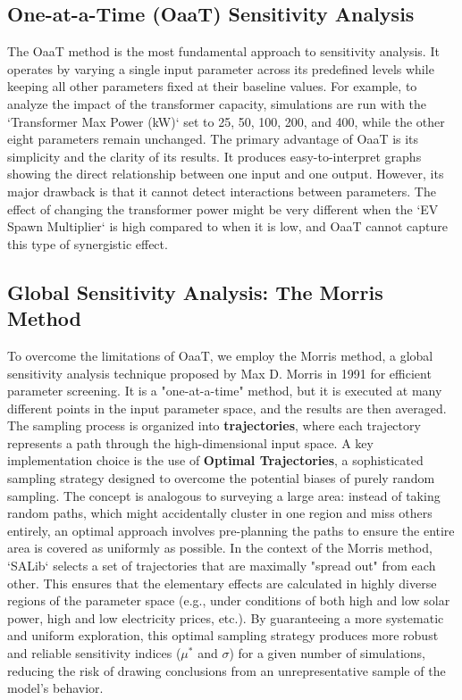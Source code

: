 \subsection{One-at-a-Time (OaaT) Sensitivity Analysis}
\noindent
The OaaT method is the most fundamental approach to sensitivity analysis. It operates by varying a single input parameter across its predefined levels while keeping all other parameters fixed at their baseline values. For example, to analyze the impact of the transformer capacity, simulations are run with the `Transformer Max Power (kW)` set to 25, 50, 100, 200, and 400, while the other eight parameters remain unchanged.
\noindent
The primary advantage of OaaT is its simplicity and the clarity of its results. It produces easy-to-interpret graphs showing the direct relationship between one input and one output. However, its major drawback is that it cannot detect interactions between parameters. The effect of changing the transformer power might be very different when the `EV Spawn Multiplier` is high compared to when it is low, and OaaT cannot capture this type of synergistic effect.

\subsection{Global Sensitivity Analysis: The Morris Method}
\noindent
To overcome the limitations of OaaT, we employ the Morris method, a global sensitivity analysis technique proposed by Max D. Morris in 1991 for efficient parameter screening. It is a "one-at-a-time" method, but it is executed at many different points in the input parameter space, and the results are then averaged.
\noindent
The sampling process is organized into \textbf{trajectories}, where each trajectory represents a path through the high-dimensional input space. A key implementation choice is the use of \textbf{Optimal Trajectories}, a sophisticated sampling strategy designed to overcome the potential biases of purely random sampling.
\noindent
The concept is analogous to surveying a large area: instead of taking random paths, which might accidentally cluster in one region and miss others entirely, an optimal approach involves pre-planning the paths to ensure the entire area is covered as uniformly as possible. In the context of the Morris method, `SALib` selects a set of trajectories that are maximally "spread out" from each other. This ensures that the elementary effects are calculated in highly diverse regions of the parameter space (e.g., under conditions of both high and low solar power, high and low electricity prices, etc.). By guaranteeing a more systematic and uniform exploration, this optimal sampling strategy produces more robust and reliable sensitivity indices ($\mu^*$ and $\sigma$) for a given number of simulations, reducing the risk of drawing conclusions from an unrepresentative sample of the model's behavior.


